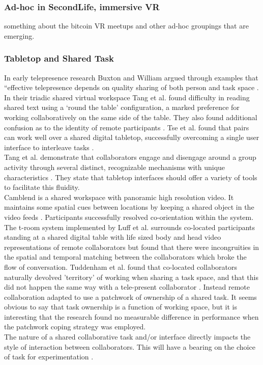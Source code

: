 \subsubsection{Ad-hoc in SecondLife, immersive VR}
something about the bitcoin VR meetups and other ad-hoc groupings that are emerging.
  \subsubsection{Tabletop and Shared Task}
In early telepresence research Buxton and William argued through examples that ``effective telepresence depends on quality sharing of both person and task space \cite{Buxton1992a}.\\
In their triadic shared virtual workspace Tang et al. found difficulty in reading shared text using a `round the table' configuration, a marked preference for working collaboratively on the same side of the table. They also found additional confusion as to the identity of remote participants \cite{Tang2010}.
Tse et al. found that pairs can work well over a shared digital tabletop, successfully overcoming a single user interface to interleave tasks \cite{Tse2007}.\\
Tang et al. demonstrate that collaborators engage and disengage around a group activity through several distinct, recognizable mechanisms with unique characteristics \cite{Tang2006}. They state that tabletop interfaces should offer a variety of tools to facilitate this fluidity.\\
Camblend is a shared workspace with panoramic high resolution video. It maintains some spatial cues between locations by keeping a shared object in the video feeds \cite{Norris2013a, Norris2012}. Participants successfully resolved co-orientation within the system.\\
The t-room system implemented by Luff et al. surrounds co-located participants standing at a shared digital table with life sized body and head video representations of remote collaborators \cite{Luff2011} but found that there were incongruities in the spatial and temporal matching between the collaborators which broke the flow of conversation.
Tuddenham et al. found that co-located collaborators naturally devolved 'territory' of working when sharing a task space, and that this did not happen the same way with a tele-present collaborator \cite{tuddenham2009territorial}. Instead remote collaboration adapted to use a patchwork of ownership of a shared task. It seems obvious to say that task ownership is a function of working space, but it is interesting that the research found no measurable difference in performance when the patchwork coping strategy was employed.\\
The nature of a shared collaborative task and/or interface directly impacts the style of interaction between collaborators. This will have a bearing on the choice of task for experimentation \cite{Jamil2011, Jetter2011a}.


